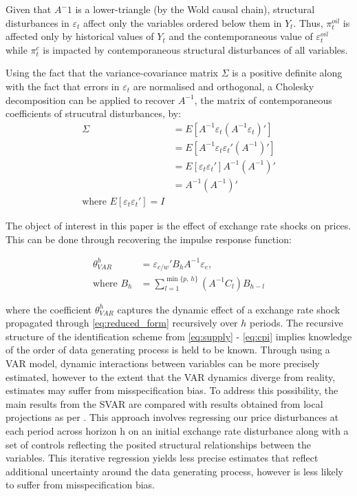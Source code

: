 \documentclass[12pt]{article}
\begin{document}
Given that $A^-1$ is a lower-triangle (by the Wold causal chain), structural disturbances in $\varepsilon_t$ affect only the variables ordered below them in $Y_t$. Thus, $\pi^{oil}_{t}$ is affected only by historical values of $Y_t$ and the contemporaneous value of $\varepsilon^{oil}_{t}$ while $\pi^{c}_{t}$ is impacted by contemporaneous structural disturbances of all variables. 

Using the fact that the variance-covariance matrix $\Sigma$ is a positive definite along with the fact that errors in $\varepsilon_t$ are normalised and orthogonal, a Cholesky decomposition can be applied to recover $A^{-1}$, the matrix of contemporaneous coefficients of strucutral disturbances, by:  \begin{align} 
\Sigma  &= E[A^{-1}\varepsilon_t (A^{-1}\varepsilon_t)']\\ 
&= E[A^{-1}\varepsilon_t \varepsilon_t'({A^{-1}})'] \\
&=  E[\varepsilon_t \varepsilon_{t}'] A^{-1}({A^{-1}})' \\
 &= A^{-1}({A^{-1}})' \\ \text{where } E[\varepsilon_t \varepsilon_t'] = I 
 \end{align}

The object of interest in this paper is the effect of exchange rate shocks on prices. This can be done through recovering the impulse response function:

\begin{align}  \label{eq:irf}
    \theta_{VAR}^h &= {\varepsilon_{c / w}}' B_h A^{-1} \varepsilon_e,  \\
    \text{where } B_h &= \sum_{l=1}^{\min\{p,\, h\}} (A^{-1}C_l)B_{h-l} \label{eq:Bh}
\end{align}

where the coefficient $\theta_{VAR}^h$ captures the dynamic effect of a exchange rate shock propagated through \eqref{eq:reduced_form} recursively over $h$ periods. The recursive structure of the identification scheme from \eqref{eq:supply} - \eqref{eq:cpi} implies knowledge of the order of data generating process is held to be known. Through using a VAR model, dynamic interactions between variables can be more precisely estimated, however to the extent that the VAR dynamics diverge from reality, estimates may suffer from misspecification bias. To address this possibility, the main results from the SVAR are compared with results obtained from local projections as per \textcite{Jorda2005}. This approach involves regressing our price disturbances at each period across horizon h on an initial exchange rate disturbance along with a set of controls reflecting the posited structural relationships between the variables. This iterative regression yields less precise estimates that reflect additional uncertainty around the data generating process, however is less likely to suffer from misspecification bias. 
\end{document}

